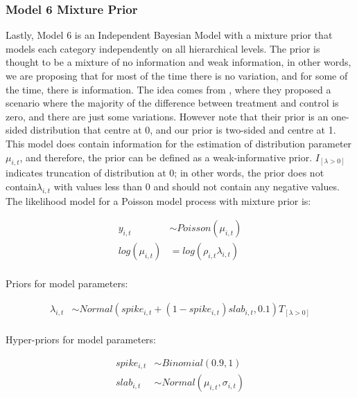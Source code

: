 \subsubsection{Model 6 Mixture Prior}

Lastly, Model 6 is an Independent Bayesian Model with a mixture prior that models each category independently on all hierarchical levels. The prior is thought to be a mixture of no information and weak information, in other words, we are proposing that for most of the time there is no variation, and for some of the time, there is information. The idea comes from \citet{berry2004}, where they proposed a scenario where the majority of the difference between treatment and control is zero, and there are just some variations. However note that their prior is an one-sided distribution that centre at 0, and our prior is two-sided and centre at 1. This model does contain information for the estimation of distribution parameter $\mu_{i,t}$, and therefore, the prior can be defined as a weak-informative prior. $I_{[\lambda>0]}$ indicates truncation of distribution at 0; in other words, the prior does not contain$\lambda_{i,t}$ with values less than 0 and should not contain any negative values. The likelihood model for a Poisson model process with mixture prior is:

\begin{equation*} \label{Poissonm6a}
\begin{aligned}
y_{i,t} & \sim Poisson(\mu_{i,t}) \\  
log(\mu_{i,t}) & = log(\rho_{i,t}\lambda_{i,t}) \\
\end{aligned}
\end{equation*}

Priors for model parameters:

\begin{equation*} \label{Poissonm6b}
\begin{aligned}
\lambda_{i,t} & \sim Normal(spike_{i,t} + (1 - spike_{i,t})slab_{i,t}, 0.1) T_{[\lambda>0]} \\
\end{aligned}
\end{equation*}

Hyper-priors for model parameters:

\begin{equation*} \label{Poissonm6c}
\begin{aligned}
spike_{i,t} & \sim Binomial(0.9,1)\\
slab_{i,t} &\sim Normal(\mu_{i,t},\sigma_{i,t})\\
\end{aligned}
\end{equation*}

